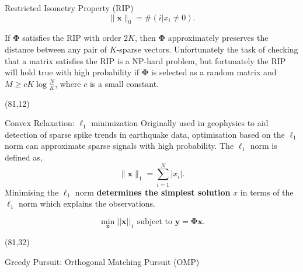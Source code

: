 \documentclass[final]{beamer}
\begin{document}
\begin{frame}{}
\begin{textblock}{36}
\begin{block}{Restricted Isometry Property (RIP)}
\begin{equation*}
\|\boldsymbol{x}\|_0 = \#(i|x_i \neq 0). 
\end{equation*}
 
If $\boldsymbol{\Phi}$ satisfies the RIP with order $2K$, then $\boldsymbol{\Phi}$ approximately preserves the distance between any pair of $K$-sparse vectors. Unfortunately the task of checking that a matrix satisfies the RIP is a NP-hard problem, but fortunately the RIP will hold true with high probability if $\boldsymbol{\Phi}$ is selected as a random matrix and $M \geq cK\log \frac{N}{K}$, where $c$ is a small constant. 

\end{block}
\end{textblock}









\begin{textblock}{36}(81,12)
  \begin{block}{Convex Relaxation: $\ell_1$ minimization}
 Originally used in geophysics to aid detection of sparse spike trends in earthquake data, optimisation based on the $\ell_1$ norm can approximate sparse signals with high probability.   The $\ell_1$ norm is defined as,  
\begin{equation*}
  \|\boldsymbol{x}\|_1 = \sum_{i=1}^{N}|x_i|.
\end{equation*}
Minimising the $\ell_1$ norm \textbf{\textcolor{likePurple}{determines the simplest solution}} $x$ in terms of the $\ell_1$ norm which explains the observations. 

\begin{equation*}
 \label{eq:4}
 \min_{\boldsymbol{x}} ||\boldsymbol{x}||_1 \text{ subject to } \boldsymbol{y} = \boldsymbol{\Phi} \boldsymbol{x}.
\end{equation*}
  \end{block}
  
\end{textblock}

\begin{textblock}{36}(81,32)
  \begin{block}{Greedy Pursuit: Orthogonal Matching Pursuit (OMP)}




\end{block}
\end{textblock}
\end{frame}
\end{document}
